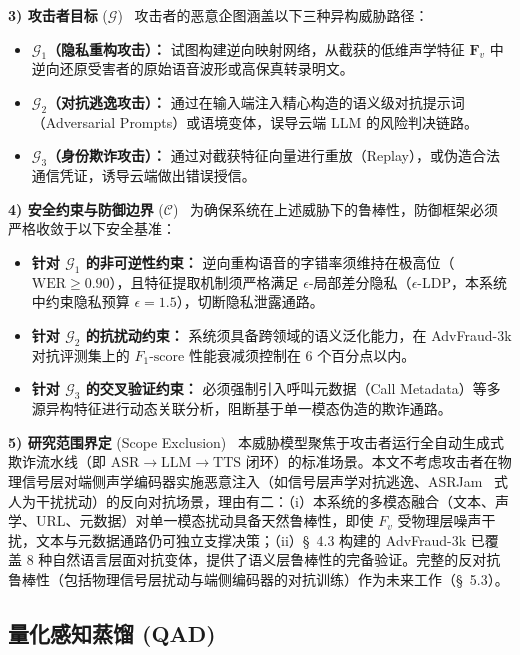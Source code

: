 \documentclass[11pt, a4paper]{article}
\begin{document}
\textbf{3) 攻击者目标} ($\mathcal{G}$)
~攻击者的恶意企图涵盖以下三种异构威胁路径：

\begin{itemize}
    \item \textbf{$\mathcal{G}_1$（隐私重构攻击）：} 试图构建逆向映射网络，从截获的低维声学特征 $\bm{F}_v$ 中逆向还原受害者的原始语音波形或高保真转录明文。
    \item \textbf{$\mathcal{G}_2$（对抗逃逸攻击）：} 通过在输入端注入精心构造的语义级对抗提示词（Adversarial Prompts）或语境变体，误导云端 LLM 的风险判决链路。
    \item \textbf{$\mathcal{G}_3$（身份欺诈攻击）：} 通过对截获特征向量进行重放（Replay），或伪造合法通信凭证，诱导云端做出错误授信。
\end{itemize}

\textbf{4) 安全约束与防御边界} ($\mathcal{C}$)
~为确保系统在上述威胁下的鲁棒性，防御框架必须严格收敛于以下安全基准：
\begin{itemize}
    \item \textbf{针对 $\mathcal{G}_1$ 的非可逆性约束：} 逆向重构语音的字错率须维持在极高位（$\text{WER} \ge 0.90$），且特征提取机制须严格满足 $\epsilon$-局部差分隐私（$\epsilon$-LDP，本系统中约束隐私预算 $\epsilon = 1.5$），切断隐私泄露通路。
    \item \textbf{针对 $\mathcal{G}_2$ 的抗扰动约束：} 系统须具备跨领域的语义泛化能力，在 AdvFraud-3k 对抗评测集上的 $F_1\text{-score}$ 性能衰减须控制在 6 个百分点以内。
    \item \textbf{针对 $\mathcal{G}_3$ 的交叉验证约束：} 必须强制引入呼叫元数据（Call Metadata）等多源异构特征进行动态关联分析，阻断基于单一模态伪造的欺诈通路。
\end{itemize}

\textbf{5) 研究范围界定} (Scope Exclusion)
~本威胁模型聚焦于攻击者运行全自动生成式欺诈流水线（即 $\text{ASR}\!\rightarrow\!\text{LLM}\!\rightarrow\!\text{TTS}$ 闭环）的标准场景。本文不考虑攻击者在物理信号层对端侧声学编码器实施恶意注入（如信号层声学对抗逃逸、ASRJam~\cite{19} 式人为干扰扰动）的反向对抗场景，理由有二：（i）本系统的多模态融合（文本、声学、URL、元数据）对单一模态扰动具备天然鲁棒性，即使 $F_v$ 受物理层噪声干扰，文本与元数据通路仍可独立支撑决策；（ii）\S~4.3 构建的 AdvFraud-3k 已覆盖 8 种自然语言层面对抗变体，提供了语义层鲁棒性的完备验证。完整的反对抗鲁棒性（包括物理信号层扰动与端侧编码器的对抗训练）作为未来工作（\S~5.3）。
 
\subsection{量化感知蒸馏 (QAD)}
\end{document}
